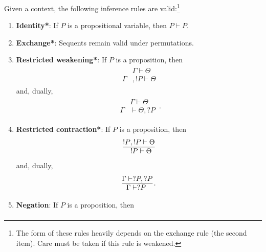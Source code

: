     Given a context, the following inference rules are valid:\footnote{The form of these rules heavily depends on the exchange rule (the second item). Care must be taken if this rule is weakened.}
    \begin{enumerate}
        \item\textbf{Identity*}: If $P$ is a propositional variable, then $P\vdash P$.
        \item\textbf{Exchange*}: Sequents remain valid under permutations.
        \item\textbf{Restricted weakening*}: If $P$ is a proposition, then
            \begin{gather}
                \begin{aligned}
                    &\Gamma\vdash\Theta\\
                    \hline
                    \Gamma&,!P\vdash\Theta
                \end{aligned}
            \end{gather}
            and, dually,
            \begin{gather}
                \begin{aligned}
                    &\Gamma\vdash\Theta\\
                    \hline
                    \Gamma&\vdash\Theta,?P
                \end{aligned}\,.
            \end{gather}
        \item\textbf{Restricted contraction*}: If $P$ is a proposition, then
            \begin{gather}
                \begin{aligned}
                    !P&,!P\vdash\Theta\\
                    \hline
                    &!P\vdash\Theta
                \end{aligned}
            \end{gather}
            and, dually,
            \begin{gather}
                \begin{aligned}
                    \Gamma&\vdash?P,?P\\
                    \hline
                    &\Gamma\vdash?P
                \end{aligned}\,.
            \end{gather}
        \item\textbf{Negation}: If $P$ is a proposition, then
            \begin{gather}

\end{gather}
\end{enumerate}
